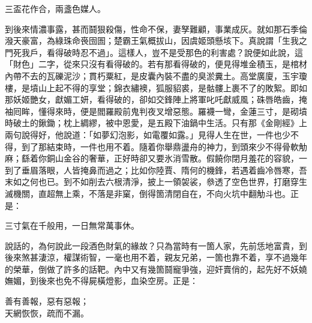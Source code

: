 \begin{myquote}
三盃花作合，兩盞色媒人。
\end{myquote}

到後來情濃事露，甚而鬪狠殺傷，{}性命不保，妻孥難顧，事業成灰。就如那石季倫潑天豪富，為綠珠命䘮囹圄；楚霸王氣概拔山，因虞姬頭懸垓下。真說謂「生我之門死我戶，看得破時忍不過」。這樣人，豈不是受那色的利害處？說便如此說，這「財色」二字，從來只沒有看得破的。{}若有那看得破的，便見得堆金積玉，是棺材內帶不去的瓦礫泥沙；貫朽粟紅，是皮囊內裝不盡的臭淤糞土。高堂廣廈，玉宇瓊樓，是墳山上起不得的享堂；錦衣繡襖，狐服貂裘，是骷髏上裹不了的敗絮。即如那妖姬艷女，獻媚工妍，看得破的，卻如交鋒陣上將軍叱吒獻威風；硃唇皓齒，掩袖囘眸，懂得來時，便是閻羅殿前鬼判夜叉增惡態。羅襪一彎，金蓮三寸，是砌墳時破土的鍬鋤；{}枕上綢繆，被中恩愛，是五殿下油鍋中生活。只有那《金剛經》上兩句說得好，他說道：「如夢幻泡影，如電覆如露。」見得人生在世，一件也少不得，到了那結束時，一件也用不着。隨着你舉鼎盪舟的神力，到頭來少不得骨軟觔麻；繇着你銅山金谷的奢華，正好時卻又要氷消雪散。假饒你閉月羞花的容貌，一到了垂眉落眼，人皆掩鼻而過之；比如你陸賈、隋何的機鋒，若遇着齒冷唇寒，吾末如之何也已。{}到不如削去六根清淨，{}披上一領袈裟，叅透了空色世界，打磨穿生滅機關，直超無上乘，不落是非窠，倒得箇清閉自在，不向火坑中翻觔斗也。正是：

\begin{myquote}
三寸氣在千般用，一日無常萬事休。
\end{myquote}

說話的，為何說此一段酒色財氣的緣故？只為當時有一箇人家，先前恁地富貴，到後來煞甚淒涼，權謀術智，一毫也用不着，親友兄弟，一箇也靠不着，享不過幾年的榮華，倒做了許多的話靶。內中又有幾箇鬪寵爭強，迎奸賣俏的，起先好不妖嬈嫵媚，到後來也免不得屍橫燈影，血染空房。正是：

\begin{myquote}
善有善報，惡有惡報；\\天網恢恢，疏而不漏。
\end{myquote}

